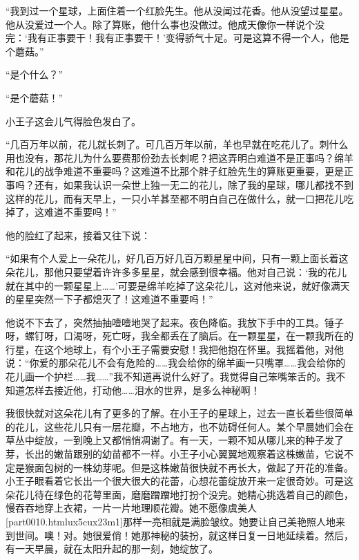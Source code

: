 “我到过一个星球，上面住着一个红脸先生。他从没闻过花香。他从没望过星星。他从没爱过一个人。除了算账，他什么事也没做过。他成天像你一样说个没完：‘我有正事要干！我有正事要干！'变得骄气十足。可是这算不得一个人，他是个蘑菇。”

“是个什么？”

“是个蘑菇！”

小王子这会儿气得脸色发白了。

“几百万年以前，花儿就长刺了。可几百万年以前，羊也早就在吃花儿了。刺什么用也没有，那花儿为什么要费那份劲去长刺呢？把这弄明白难道不是正事吗？绵羊和花儿的战争难道不重要吗？这难道不比那个胖子红脸先生的算账更重要，更是正事吗？还有，如果我认识一朵世上独一无二的花儿，除了我的星球，哪儿都找不到这样的花儿，而有天早上，一只小羊甚至都不明白自己在做什么，就一口把花儿吃掉了，这难道不重要吗！”

他的脸红了起来，接着又往下说：

“如果有个人爱上一朵花儿，好几百万好几百万颗星星中间，只有一颗上面长着这朵花儿，那他只要望着许许多多星星，就会感到很幸福。他对自己说：‘我的花儿就在其中的一颗星星上\ldots{}\ldots{}'可要是绵羊吃掉了这朵花儿，这对他来说，就好像满天的星星突然一下子都熄灭了！这难道不重要吗！”

{\startalignment[center]
 \stopalignment}

他说不下去了，突然抽抽噎噎地哭了起来。夜色降临。我放下手中的工具。锤子呀，螺钉呀，口渴呀，死亡呀，我全都丢在了脑后。在一颗星星，在一颗我所在的行星，在这个地球上，有个小王子需要安慰！我把他抱在怀里。我摇着他，对他说：“你爱的那朵花儿不会有危险的\ldots{}\ldots{}我会给你的绵羊画一只嘴罩\ldots{}\ldots{}我会给你的花儿画一个护栏\ldots{}\ldots{}我\ldots{}\ldots{}”我不知道再说什么好了。我觉得自己笨嘴笨舌的。我不知道怎样去接近他，打动他\ldots{}\ldots{}泪水的世界，是多么神秘啊！


\stoptitle

\starttitle[title={8},reference={part0010.html_a011}]

我很快就对这朵花儿有了更多的了解。在小王子的星球上，过去一直长着些很简单的花儿，这些花儿只有一层花瓣，不占地方，也不妨碍任何人。某个早晨她们会在草丛中绽放，一到晚上又都悄悄凋谢了。有一天，一颗不知从哪儿来的种子发了芽，长出的嫩苗跟别的幼苗都不一样。小王子小心翼翼地观察着这株嫩苗，它说不定是猴面包树的一株幼芽呢。但是这株嫩苗很快就不再长大，做起了开花的准备。小王子眼看着它长出一个很大很大的花蕾，心想花蕾绽放开来一定很奇妙。可是这朵花儿待在绿色的花萼里面，磨磨蹭蹭地打扮个没完。她精心挑选着自己的颜色，慢吞吞地穿上衣裙，一片一片地理顺花瓣。她不愿像虞美人\goto{\high{{[}1{]}}}[part0010.htmlux5cux23m1]那样一亮相就是满脸皱纹。她要让自己美艳照人地来到世间。噢！对。她很爱俏！她那神秘的装扮，就这样日复一日地延续着。然后，有一天早晨，就在太阳升起的那一刻，她绽放了。

